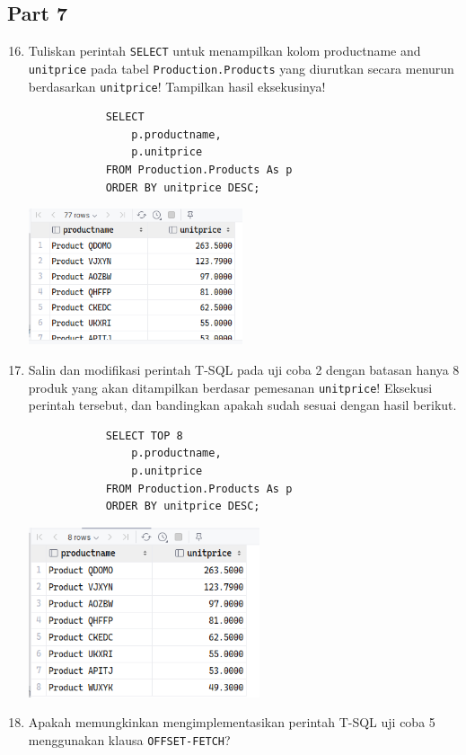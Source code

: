 \documentclass[12pt,titlepage]{article}
\begin{document}
\subsection{Part 7}
\begin{enumerate}
    \setcounter{enumi}{15}
    \item {
        Tuliskan perintah \texttt{SELECT} untuk menampilkan kolom productname and\\ \texttt{unitprice} pada
        tabel \texttt{Production.Products} yang diurutkan secara menurun berdasarkan \texttt{unitprice}! Tampilkan
        hasil eksekusinya!

        \begin{verbatim}
            SELECT
                p.productname,
                p.unitprice
            FROM Production.Products As p
            ORDER BY unitprice DESC;
        \end{verbatim}

        \begin{center}
            \includegraphics[height=4cm]{./images/p7-n1.png}
        \end{center}
    }
    \item {
        Salin dan modifikasi perintah T-SQL pada uji coba 2 dengan batasan hanya 8 produk
        yang akan ditampilkan berdasar pemesanan \texttt{unitprice}! Eksekusi perintah tersebut, dan
        bandingkan apakah sudah sesuai dengan hasil berikut.

        \begin{verbatim}
            SELECT TOP 8
                p.productname,
                p.unitprice
            FROM Production.Products As p
            ORDER BY unitprice DESC;
        \end{verbatim}

        \begin{center}
            \includegraphics[height=5cm]{./images/p7-n2.png}
        \end{center}
    }
    \item {
        Apakah memungkinkan mengimplementasikan perintah T-SQL uji coba 5
        menggunakan klausa \texttt{OFFSET-FETCH}?

}
\end{enumerate}
\end{document}
